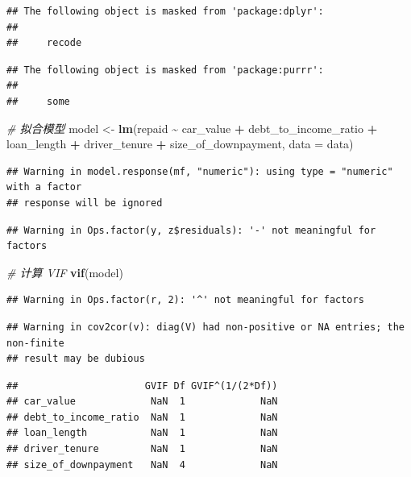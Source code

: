 \documentclass[
]{article}
\newenvironment{Shaded}{\begin{snugshade}}{\end{snugshade}}
\newcommand{\AttributeTok}[1]{\textcolor[rgb]{0.13,0.29,0.53}{#1}}
\newcommand{\CommentTok}[1]{\textcolor[rgb]{0.56,0.35,0.01}{\textit{#1}}}
\newcommand{\FunctionTok}[1]{\textcolor[rgb]{0.13,0.29,0.53}{\textbf{#1}}}
\newcommand{\NormalTok}[1]{#1}
\newcommand{\OtherTok}[1]{\textcolor[rgb]{0.56,0.35,0.01}{#1}}
\newcommand{\SpecialCharTok}[1]{\textcolor[rgb]{0.81,0.36,0.00}{\textbf{#1}}}
\begin{document}
\begin{verbatim}
## The following object is masked from 'package:dplyr':
## 
##     recode
\end{verbatim}

\begin{verbatim}
## The following object is masked from 'package:purrr':
## 
##     some
\end{verbatim}

\begin{Shaded}
\begin{Highlighting}[]
\CommentTok{\# 拟合模型}
\NormalTok{model }\OtherTok{\textless{}{-}} \FunctionTok{lm}\NormalTok{(repaid }\SpecialCharTok{\textasciitilde{}}\NormalTok{ car\_value }\SpecialCharTok{+}\NormalTok{ debt\_to\_income\_ratio }\SpecialCharTok{+} 
\NormalTok{            loan\_length }\SpecialCharTok{+}\NormalTok{ driver\_tenure }\SpecialCharTok{+}\NormalTok{ size\_of\_downpayment,}
            \AttributeTok{data =}\NormalTok{ data)}
\end{Highlighting}
\end{Shaded}

\begin{verbatim}
## Warning in model.response(mf, "numeric"): using type = "numeric" with a factor
## response will be ignored
\end{verbatim}

\begin{verbatim}
## Warning in Ops.factor(y, z$residuals): '-' not meaningful for factors
\end{verbatim}

\begin{Shaded}
\begin{Highlighting}[]
\CommentTok{\# 计算 VIF}
\FunctionTok{vif}\NormalTok{(model)}
\end{Highlighting}
\end{Shaded}

\begin{verbatim}
## Warning in Ops.factor(r, 2): '^' not meaningful for factors
\end{verbatim}

\begin{verbatim}
## Warning in cov2cor(v): diag(V) had non-positive or NA entries; the non-finite
## result may be dubious
\end{verbatim}

\begin{verbatim}
##                      GVIF Df GVIF^(1/(2*Df))
## car_value             NaN  1             NaN
## debt_to_income_ratio  NaN  1             NaN
## loan_length           NaN  1             NaN
## driver_tenure         NaN  1             NaN
## size_of_downpayment   NaN  4             NaN
\end{verbatim}
\end{document}
